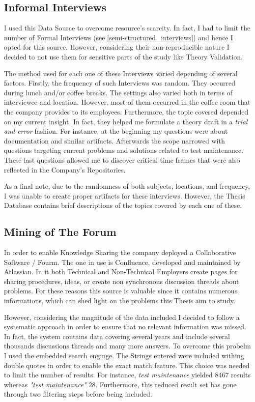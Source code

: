 \subsection{Informal Interviews}
I used this Data Source to overcome resource's scarcity. In fact, I had to limit the number of Formal Interviews (see \ref{semi-structured_interviews}) and hence I opted for this source. However, considering their non-reproducible nature I decided to not use them for sensitive parts of the study like Theory Validation. 

The method used for each one of these Interviews varied depending of several factors. Firstly, the frequency of such Interviews was random. They occurred during lunch and/or coffee breaks. The settings also varied both in terms of interviewee and location. However, most of them occurred in the coffee room that the company provides to its employees. Furthermore, the topic covered depended on my current insight. In fact, they helped me formulate a theory draft in a \textit{trial and error} fashion. For instance, at the beginning my questions were about documentation and similar artifacts. Afterwards the scope narrowed with questions targeting current problems and solutions related to test maintenance. These last questions allowed me to discover critical time frames that were also reflected in the Company's Repositories.

As a final note, due to the randomness of both subjects, locations, and frequency, I was unable to create proper artifacts for these interviews. However, the Thesis Database contains brief descriptions of the topics covered by each one of these.

\subsection{Mining of The Forum}
In order to enable Knowledge Sharing the company deployed a Collaborative Software / Fourm. The one in use is Confluence, developed and maintained by Atlassian. In it both Technical and Non-Technical Employers create pages for sharing procedures, ideas, or create non synchronous discussion threads about problems. For these reasons this source is valuable since it contains numerous informations, which can shed light on the problems this Thesis aim to study.

However, considering the magnitude of the data included I decided to follow a systematic approach in order to ensure that no relevant information was missed. In fact, the system contains data covering several years and include several thousands discussions threads and many more answers. To overcome this probelm I used the embedded search enginge. The Strings entered were included withing double quotes in order to enable the exact match feature. This choice was needed to limit the number of results. For instance, \textit{test maintenance} yielded 8467 results whereas \textit{"test maintenance"} 28. Furthermore, this reduced result set has gone through two filtering steps before being included.

